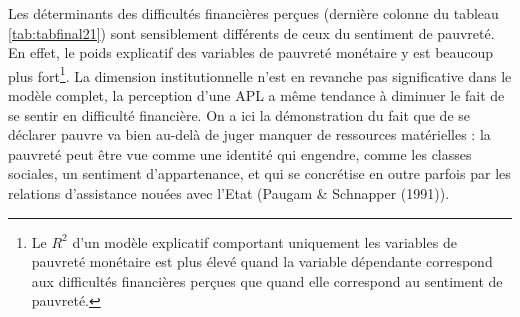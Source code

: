 \documentclass[12pt,a4paper]{reedthesis}
\begin{document}
Les déterminants des difficultés financières perçues (dernière colonne du tableau \ref{tab:tabfinal21}) sont sensiblement différents de ceux du sentiment de pauvreté. En effet, le poids explicatif des variables de pauvreté monétaire y est beaucoup plus fort\footnote{Le \(R^2\) d'un modèle explicatif comportant uniquement les variables de pauvreté monétaire est plus élevé quand la variable dépendante correspond aux difficultés financières perçues que quand elle correspond au sentiment de pauvreté.}. La dimension institutionnelle n'est en revanche pas significative dans le modèle complet, la perception d'une APL a même tendance à diminuer le fait de se sentir en difficulté financière. On a ici la démonstration du fait que de se déclarer pauvre va bien au-delà de juger manquer de ressources matérielles : la pauvreté peut être vue comme une identité qui engendre, comme les classes sociales, un sentiment d'appartenance, et qui se concrétise en outre parfois par les relations d'assistance nouées avec l'Etat (Paugam \& Schnapper (1991)).
\end{document}
